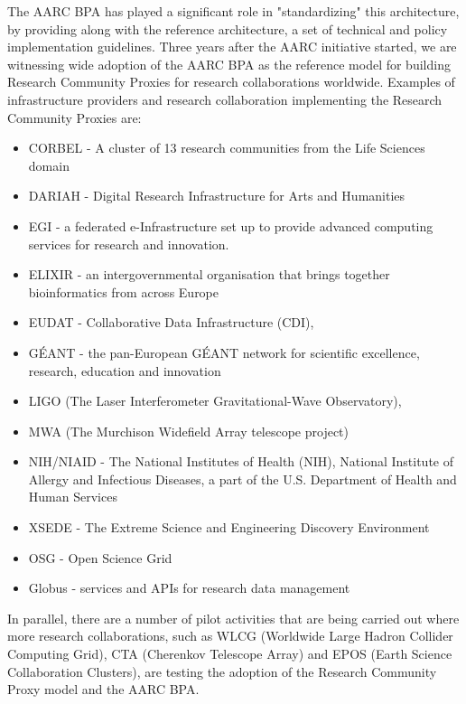 \documentclass[fleqn,11pt]{wlscirep}
\begin{document}
{The AARC BPA has played a significant role in "standardizing" this architecture, by providing along with the reference architecture, a set of technical and policy implementation guidelines\cite{aarcguidelines}. Three years after the AARC initiative started, we are witnessing wide adoption of the AARC BPA as the reference model for building Research Community Proxies for research collaborations worldwide. Examples of infrastructure providers and research collaboration implementing the Research Community Proxies are:
\begin{itemize}
  \item CORBEL - A cluster of 13 research communities from the Life Sciences domain
  \item   DARIAH - Digital Research Infrastructure for Arts and Humanities
  \item EGI - a federated e-Infrastructure set up to provide advanced computing services for research and innovation.
  \item ELIXIR - an intergovernmental organisation that brings together bioinformatics from across Europe
  \item EUDAT -  Collaborative Data Infrastructure (CDI),
  \item GÉANT - the pan-European GÉANT network for scientific excellence, research, education and innovation
  \item LIGO (The Laser Interferometer Gravitational-Wave Observatory),
  \item MWA (The Murchison Widefield Array telescope project)
  \item NIH/NIAID - The National Institutes of Health (NIH), National Institute of Allergy and Infectious Diseases, a part of the U.S. Department of Health and Human Services
  \item XSEDE - The Extreme Science and Engineering Discovery Environment
  \item OSG - Open Science Grid
  \item Globus - services and APIs for research data management
\end{itemize}
In parallel, there are a number of pilot activities that are being carried out where more research collaborations, such as WLCG (Worldwide Large Hadron Collider Computing Grid), CTA (Cherenkov Telescope Array)  and EPOS (Earth Science Collaboration Clusters), are testing the adoption of the Research Community Proxy model and the AARC BPA. 

}
\end{document}
